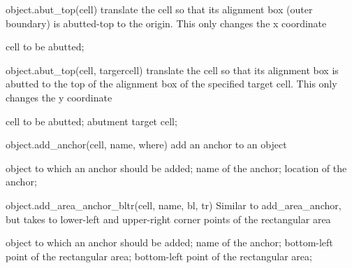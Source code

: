 \begin{APIfunc}{object.abut\_top(cell)}
    translate the cell so that its alignment box (outer boundary) is abutted-top to the origin. This only changes the x coordinate
    \begin{APIparameters}
            cell to be abutted;
    \end{APIparameters}
\end{APIfunc}
\begin{APIfunc}{object.abut\_top(cell, targercell)}
    translate the cell so that its alignment box is abutted to the top of the alignment box of the specified target cell. This only changes the y coordinate
    \begin{APIparameters}
            cell to be abutted;
            abutment target cell;
    \end{APIparameters}
\end{APIfunc}
\begin{APIfunc}{object.add\_anchor(cell, name, where)}
    add an anchor to an object
    \begin{APIparameters}
            object to which an anchor should be added;
            name of the anchor;
            location of the anchor;
    \end{APIparameters}
\end{APIfunc}
\begin{APIfunc}{object.add\_area\_anchor\_bltr(cell, name, bl, tr)}
    Similar to add\_area\_anchor, but takes to lower-left and upper-right corner points of the rectangular area
    \begin{APIparameters}
            object to which an anchor should be added;
            name of the anchor;
            bottom-left point of the rectangular area;
            bottom-left point of the rectangular area;
    \end{APIparameters}
\end{APIfunc}
